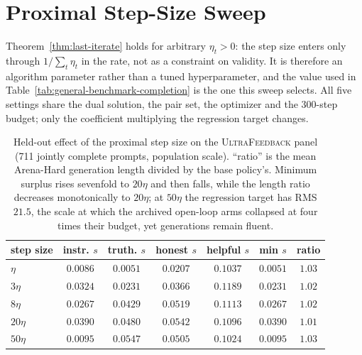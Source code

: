 \documentclass{article}
\theoremstyle{remark}
\theoremstyle{plain}
\begin{document}
\clearpage
\section{Proximal Step-Size Sweep}
\label{app:eta}
Theorem~\ref{thm:last-iterate} holds for arbitrary $\eta_t>0$: the step size enters only through $1/\sum_t\eta_t$ in the rate, not as a constraint on validity. It is therefore an algorithm parameter rather than a tuned hyperparameter, and the value used in Table~\ref{tab:general-benchmark-completion} is the one this sweep selects. All five settings share the dual solution, the pair set, the optimizer and the 300-step budget; only the coefficient multiplying the regression target changes.

\begin{table}[htbp]
\centering\footnotesize
\setlength{\tabcolsep}{4.0pt}
\caption{Held-out effect of the proximal step size on the \textsc{UltraFeedback} panel (711 jointly complete prompts, population scale). ``ratio'' is the mean Arena-Hard generation length divided by the base policy's. Minimum surplus rises sevenfold to $20\eta$ and then falls, while the length ratio decreases monotonically to $20\eta$; at $50\eta$ the regression target has RMS $21.5$, the scale at which the archived open-loop arms collapsed at four times their budget, yet generations remain fluent.}
\label{tab:eta-sweep}
\begin{tabular}{lcccccc}
\toprule
step size & instr. $s$ & truth. $s$ & honest $s$ & helpful $s$ & min $s$ & ratio\\
\midrule
$\eta$ & $0.0086$ & $0.0051$ & $0.0207$ & $0.1037$ & $0.0051$ & $1.03$\\
$3\eta$ & $0.0324$ & $0.0231$ & $0.0366$ & $\mathbf{0.1189}$ & $0.0231$ & $1.02$\\
$8\eta$ & $0.0267$ & $0.0429$ & $0.0519$ & $0.1113$ & $0.0267$ & $1.02$\\
$20\eta$ & $\mathbf{0.0390}$ & $0.0480$ & $\mathbf{0.0542}$ & $0.1096$ & $\mathbf{0.0390}$ & $\mathbf{1.01}$\\
$50\eta$ & $0.0095$ & $\mathbf{0.0547}$ & $0.0505$ & $0.1024$ & $0.0095$ & $1.03$\\
\bottomrule
\end{tabular}
\end{table}
\end{document}

